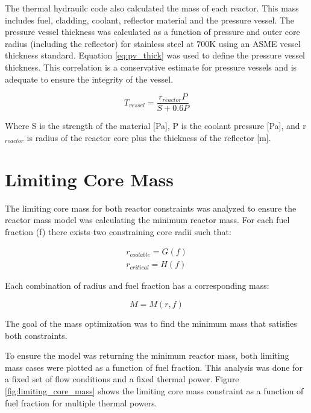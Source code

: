 The thermal hydrauilc code also calculated the mass of each reactor. This
mass includes fuel, cladding, coolant, reflector material and the pressure
vessel. The pressure vessel thickness was calculated as a function of pressure
and outer core radius (including the reflector) for stainless steel at \~700K
using an ASME vessel thickness standard. Equation \ref{eq:pv_thick} was used to
define the pressure vessel thickness. This correlation is a conservative
estimate for pressure vessels and is adequate to ensure the integrity of the
vessel.

\begin{equation}
    T_{vessel} = \frac{r_{reactor}P}{S + 0.6P}
    \label{eq:pv_thick}
\end{equation}

Where S is the strength of the material [Pa], P is the coolant pressure [Pa],
and r$_{reactor}$ is radius of the reactor core plus the thickness of the
reflector [m].

\section{Limiting Core Mass}
The limiting core mass for both reactor constraints was analyzed to ensure the
reactor mass model was calculating the minimum reactor mass. For each fuel
fraction (f) there exists two constraining core radii such that:

\begin{align}
    r_{coolable} = G(f) \\
    r_{critical} = H(f)
\end{align}

Each combination of radius and fuel fraction has a corresponding mass:

\begin{equation}
    M = M(r, f)
\end{equation}

The goal of the mass optimization was to find the minimum mass that satisfies
both constraints.

To ensure the model was returning the minimum reactor mass, both limiting mass
cases were plotted as a function of fuel fraction. This analysis was done for a
fixed set of flow conditions and a fixed thermal power. Figure
\ref{fig:limiting_core_mass} shows the limiting core mass constraint as a
function of fuel fraction for multiple thermal powers.

